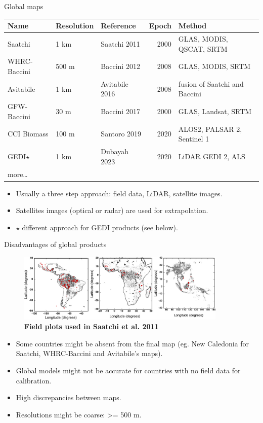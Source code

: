\documentclass[10pt,table,dvipsnames,compress]{beamer}
\begin{document}
\begin{frame}[label={sec:org8d54487}]{Global maps}
\begin{center}
\footnotesize
\begin{tabular}{lllrl}
Name & Resolution & Reference & Epoch & Method\\[0pt]
\hline
Saatchi & 1 km & Saatchi 2011 & 2000 & GLAS, MODIS, QSCAT, SRTM\\[0pt]
WHRC-Baccini & 500 m & Baccini 2012 & 2008 & GLAS, MODIS, SRTM\\[0pt]
Avitabile & 1 km & Avitabile 2016 & 2008 & fusion of Saatchi and Baccini\\[0pt]
GFW-Baccini & 30 m & Baccini 2017 & 2000 & GLAS, Landsat, SRTM\\[0pt]
CCI Biomass & 100 m & Santoro 2019 & 2020 & ALOS2, PALSAR 2, Sentinel 1\\[0pt]
GEDI\(\star\) & 1 km & Dubayah 2023 & 2020 & LiDAR GEDI 2, ALS\\[0pt]
more\ldots{} &  &  &  & \\[0pt]
\end{tabular}
\end{center}

\begin{itemize}
\item Usually a three step approach: field data, LiDAR, satellite images.
\item Satellites images (optical or radar) are used for extrapolation.
\item \(\star\) different approach for GEDI products (see below).
\end{itemize}
\end{frame}

\begin{frame}[label={sec:org7bc659c}]{Disadvantages of global products}
\begin{figure}[htbp]
\centering
\includegraphics[width=10cm]{figs/carbon/data-saatchi.png}
\caption{\textbf{Field plots used in Saatchi et al. 2011}}
\end{figure}

\begin{itemize}
\item Some countries might be absent from the final map (eg. New Caledonia for Saatchi, WHRC-Baccini and Avitabile's maps).
\item Global models might not be accurate for countries with no field data for calibration.
\item High discrepancies between maps.
\item Resolutions might be coarse: >= 500 m.
\end{itemize}
\end{frame}
\end{document}
